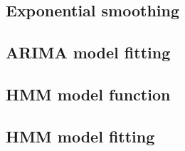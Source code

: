 \subsection{Exponential smoothing}


\subsection{ARIMA model fitting}


\subsection{HMM model function}


\subsection{HMM model fitting}


\FloatBarrier
\pagebreak

\nocite{zucchini09}




